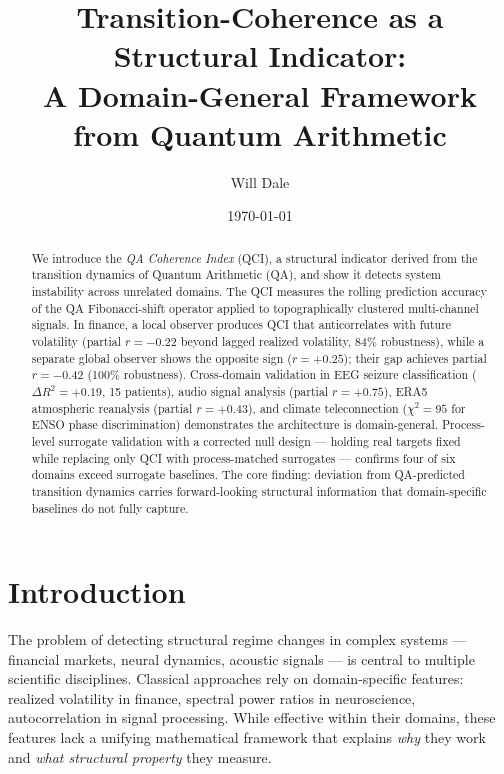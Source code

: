 \documentclass[11pt,a4paper]{article}
\title{Transition-Coherence as a Structural Indicator:\\
  A Domain-General Framework from Quantum Arithmetic}
\author{Will Dale}
\date{\today}
\begin{document}
\maketitle

\begin{abstract}
We introduce the \emph{QA Coherence Index} (QCI), a structural indicator
derived from the transition dynamics of Quantum Arithmetic (QA), and show
it detects system instability across unrelated domains. The QCI measures
the rolling prediction accuracy of the QA Fibonacci-shift operator applied
to topographically clustered multi-channel signals. In finance, a local
observer produces QCI that anticorrelates with future volatility (partial
$r = -0.22$ beyond lagged realized volatility, 84\% robustness), while a
separate global observer shows the opposite sign ($r = +0.25$); their gap
achieves partial $r = -0.42$ (100\% robustness). Cross-domain validation
in EEG seizure classification ($\Delta R^2 = +0.19$, 15 patients),
audio signal analysis (partial $r = +0.75$), ERA5 atmospheric reanalysis
(partial $r = +0.43$), and climate teleconnection ($\chi^2 = 95$ for ENSO
phase discrimination) demonstrates the architecture is domain-general.
Process-level surrogate validation with a corrected null design ---
holding real targets fixed while replacing only QCI with
process-matched surrogates --- confirms four of six domains exceed
surrogate baselines. The core finding: deviation from QA-predicted
transition dynamics carries forward-looking structural information that
domain-specific baselines do not fully capture.
\end{abstract}

\section{Introduction}

The problem of detecting structural regime changes in complex systems ---
financial markets, neural dynamics, acoustic signals --- is central to
multiple scientific disciplines. Classical approaches rely on domain-specific
features: realized volatility in finance, spectral power ratios in
neuroscience, autocorrelation in signal processing. While effective within
their domains, these features lack a unifying mathematical framework that
explains \emph{why} they work and \emph{what structural property} they
measure.
\end{document}
